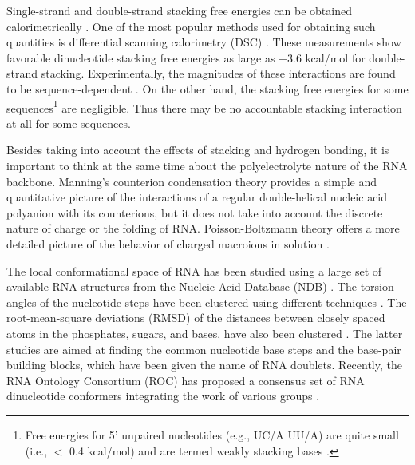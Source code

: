 Single-strand and double-strand stacking free energies can be obtained
calorimetrically \cite{freier1985}.   One of the  most popular methods
used   for  obtaining   such  quantities   is   differential  scanning
calorimetry (DSC) \cite{marky1982}.  These measurements show favorable
dinucleotide  stacking free  energies as  large as  $-$3.6  kcal/mol for
double-strand  stacking.   Experimentally,  the  magnitudes  of  these
interactions      are     found      to      be     sequence-dependent
\cite{bloomfield2000}. On  the other hand, the  stacking free energies
for some sequences\footnote{Free  energies for 5' unpaired nucleotides
  (e.g., UC/A UU/A)  are quite small (i.e., $<$  0.4 kcal/mol) and are
  termed weakly stacking  bases \cite{burkard1999, burkard1999b}.} are
negligible.  Thus there may  be no accountable stacking interaction at
all for some sequences.

Besides  taking into  account  the effects  of  stacking and  hydrogen
bonding,  it  is  important  to  think  at the  same  time  about  the
polyelectrolyte  nature  of the  RNA  backbone.  Manning's  counterion
condensation theory \cite{manning1977,  manning2003} provides a simple
and   quantitative  picture   of   the  interactions   of  a   regular
double-helical  nucleic acid  polyanion with  its counterions,  but it
does   not  take   into  account   the  discrete   nature   of  charge
\cite{bloomfield2000} or the  folding of RNA. Poisson-Boltzmann theory
offers a more detailed picture of the behavior of charged macroions in
solution \cite{antypov2005, xu2007}.

The local conformational  space of RNA has been  studied using a large
set of available  RNA structures from the Nucleic  Acid Database (NDB)
\cite{berman1992}.  The  torsion angles  of the nucleotide  steps have
been   clustered    using   different   techniques   \cite{murray2003,
  schneider2004}.   The  root-mean-square  deviations  (RMSD)  of  the
distances between closely spaced  atoms in the phosphates, sugars, and
bases, have also been  clustered \cite{sykes2005}.  The latter studies
are  aimed  at  finding  the  common nucleotide  base  steps  and  the
base-pair  building blocks,  which have  been  given the  name of  RNA
doublets.  Recently, the RNA  Ontology Consortium (ROC) has proposed a
consensus set  of RNA dinucleotide conformers integrating  the work of
various groups \cite{richardson2008}.


